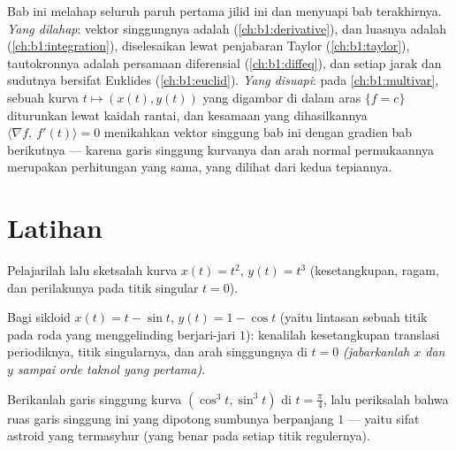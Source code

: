 \begin{remark}
\label{rem:b1:curves:perspectives}
Bab ini melahap seluruh paruh pertama jilid ini dan
menyuapi bab terakhirnya. \emph{Yang dilahap}: vektor singgungnya adalah
 (\cref{ch:b1:derivative}),  dan luasnya adalah
 (\cref{ch:b1:integration}),  diselesaikan lewat
penjabaran Taylor (\cref{ch:b1:taylor}), tautokronnya adalah
persamaan diferensial  (\cref{ch:b1:diffeq}), dan setiap
jarak dan sudutnya bersifat Euklides (\cref{ch:b1:euclid}).
\emph{Yang disuapi}: pada \cref{ch:b1:multivar}, sebuah kurva $t \mapsto (x(t),
y(t))$ yang digambar di dalam  aras $\{f = c\}$ diturunkan lewat
kaidah rantai, dan kesamaan yang dihasilkannya $\langle \nabla f,\
f'(t)\rangle = 0$ menikahkan vektor singgung bab ini dengan
gradien bab berikutnya --- karena garis singgung kurvanya dan
arah normal permukaannya merupakan perhitungan yang sama, yang dilihat
dari kedua tepiannya.
\end{remark}

\section{Latihan}

\begin{exercise}[$\star$]\label{exo:b1:curves:1}
Pelajarilah lalu sketsalah kurva $x(t) = t^2$, $y(t) = t^3$ (kesetangkupan,
ragam, dan perilakunya pada titik singular $t = 0$).
\end{exercise}

\begin{exercise}[$\star$]\label{exo:b1:curves:2}
Bagi sikloid $x(t) = t - \sin t$, $y(t) = 1 - \cos t$ (yaitu
lintasan sebuah titik pada roda yang menggelinding berjari-jari $1$): kenalilah
kesetangkupan translasi periodiknya, titik singularnya, dan
arah singgungnya di $t = 0$ \emph{(jabarkanlah $x$ dan $y$ sampai orde
taknol yang pertama)}.
\end{exercise}

\begin{exercise}[$\star$]\label{exo:b1:curves:3}
Berikanlah garis singgung kurva $(\cos^3 t, \sin^3 t)$ di $t =
\frac\pi4$, lalu periksalah bahwa ruas garis singgung ini yang dipotong
sumbunya berpanjang $1$ --- yaitu sifat astroid yang termasyhur (yang benar pada
setiap titik regulernya).
\end{exercise}

